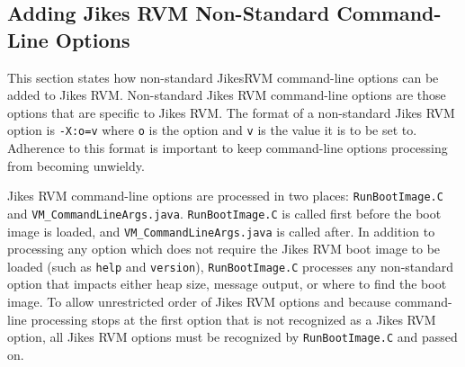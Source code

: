 \subsection{Adding Jikes RVM Non-Standard Command-Line Options}
This section states how non-standard Jikes\trademark RVM command-line
options can be added to Jikes RVM.  Non-standard Jikes RVM
command-line options are those options that are specific to Jikes RVM.
The format of a non-standard Jikes RVM option is {\tt -X:o=v} where
{\tt o} is the option and {\tt v} is the value it is to be set to.
Adherence to this format is important to keep command-line options
processing from becoming unwieldy.

Jikes RVM command-line options are processed in two places: 
{\tt RunBootImage.C} and {\tt VM\_CommandLineArgs.java}.  
{\tt RunBootImage.C} is called first before the boot image is loaded, and
{\tt VM\_CommandLineArgs.java} is called after.  In addition to
processing any option which does not require the Jikes RVM boot image
to be loaded (such as {\tt help} and {\tt version}), 
{\tt RunBootImage.C} processes any non-standard option that impacts either
heap size, message output, or where to find the boot image.  To allow
unrestricted order of Jikes RVM options and because command-line processing
stops at the first option that is not recognized as a Jikes RVM
option, all Jikes RVM options must be recognized by {\tt RunBootImage.C}
and passed on.

\JikesTMFooter
